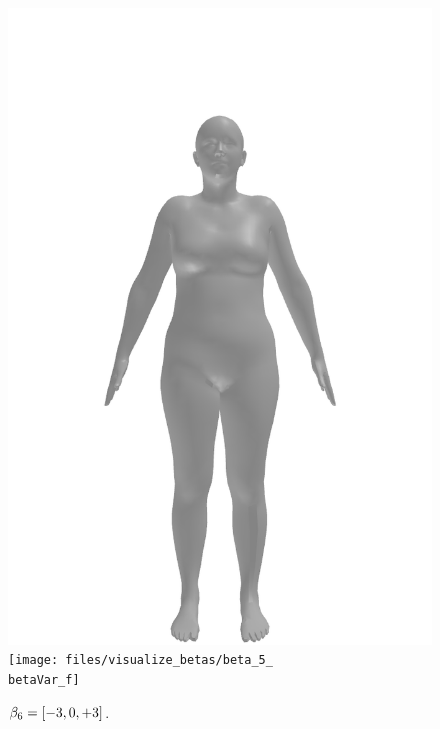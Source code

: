 \begin{figure}[ht!]
\begin{minipage}[b]{\textwidth}
        \includegraphics[width=\imgWidth]{files/visualize_betas/baseline_f}
        \texttt{[image: files/visualize\_betas/beta\_5\_\\betaVar\_f]}
        \caption[Effect of varying $\beta_6$ in SMPL.]{$\beta_6 = [-3, 0, +3]$.}
    \end{minipage}
\end{figure}

